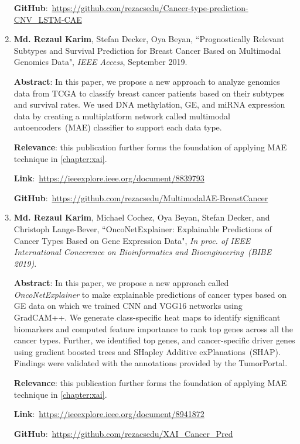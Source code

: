 \begin{enumerate}
	\textbf{GitHub}:~\url{https://github.com/rezacsedu/Cancer-type-prediction-CNV_LSTM-CAE} 
	
	\item \textbf{Md. Rezaul Karim}, Stefan Decker, Oya Beyan, ``Prognostically Relevant Subtypes and Survival Prediction for Breast Cancer Based on Multimodal Genomics Data", \emph{IEEE Access}, September 2019.
	
	\textbf{Abstract}: In this paper, we propose a new approach to analyze genomics data from TCGA to classify breast cancer patients based on their subtypes and survival rates. We used DNA methylation, GE, and miRNA expression data by creating a multiplatform network called multimodal autoencoders~(MAE) classifier to support each data type.
	
	\textbf{Relevance}: this publication further forms the foundation of applying MAE technique in \cref{chapter:xai}.
	
	\textbf{Link}:~\url{https://ieeexplore.ieee.org/document/8839793}
	
	\textbf{GitHub}:~\url{https://github.com/rezacsedu/MultimodalAE-BreastCancer}
	
	\item \textbf{Md. Rezaul Karim}, Michael Cochez, Oya Beyan, Stefan Decker, and Christoph Lange-Bever, ``OncoNetExplainer: Explainable Predictions of Cancer Types Based on Gene Expression Data", \emph{In proc. of IEEE International Concerence on Bioinformatics and Bioengineering~(BIBE 2019)}.
	
	\textbf{Abstract}: In this paper, we propose a new approach called \emph{OncoNetExplainer} to make explainable predictions of cancer types based on GE data on which we trained CNN and VGG16 networks using GradCAM++. We generate class-specific heat maps to identify significant biomarkers and computed feature importance to rank top genes across all the cancer types. Further, we identified top genes, and cancer-specific driver genes using gradient boosted trees and SHapley Additive exPlanations~(SHAP). Findings were validated with the annotations provided by the TumorPortal. 
	
	\textbf{Relevance}: this publication further forms the foundation of applying MAE technique in \cref{chapter:xai}.
	
	\textbf{Link}:~\url{https://ieeexplore.ieee.org/document/8941872}

	\textbf{GitHub}:~\url{https://github.com/rezacsedu/XAI_Cancer_Pred}
\end{enumerate}


